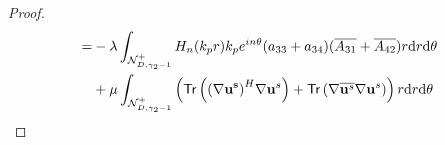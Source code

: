 \documentclass[11pt,reqno,twoside]{amsart}
\theoremstyle{definition}
\theoremstyle{remark}
\numberwithin{equation}{section}
\begin{document}
\begin{proof}
\begin{align}
					=&-\lambda \int_{\mathcal{N}_{D,\gamma_{2}-1}^{+}}H_n(k_{p} r)k_{p} e^{in\theta }(a_{33}+a_{34} )(\overline{A_{31}}+ \overline{A_{42}})r\mathrm{d}r\mathrm{d}\theta\notag\\
					&+\mu  \int_{\mathcal{N}_{D,\gamma_{2}-1}^{+}}\left({\sf Tr}\left({\left(\nabla\mathbf{u^{s}}\right)^{H} }\nabla\mathbf{u}^{s}\right)+{\sf Tr}\left(\nabla\overline{\mathbf{u}^{s}}\nabla{\mathbf{u}^{s}}\right)\right)r\mathrm{d}r\mathrm{d}\theta\notag\\

\end{align}
\end{proof}
\end{document}
